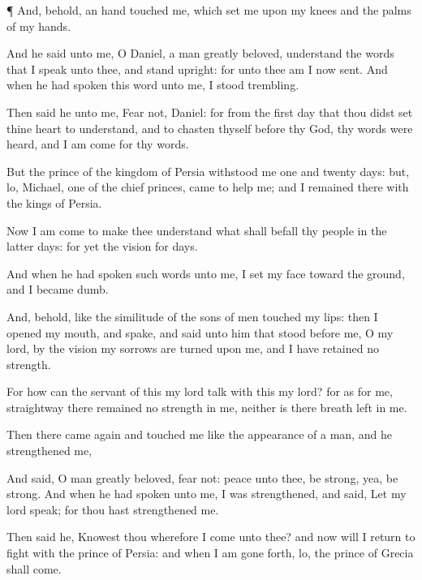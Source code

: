 {\par }{\PP {}¶ And, behold, an
hand
touched me, which
set me upon my
knees and
{} the
palms of my
hands.

And he
said unto me, O
Daniel, a
man greatly
beloved,
understand the
words that I
speak unto thee, and
stand
upright: for unto thee am I now
sent. And when he had
spoken this
word unto me, I
stood
trembling.

Then
said he unto me,
Fear not,
Daniel: for from the
first
day that thou didst
set thine
heart to
understand, and to
chasten thyself
before thy
God, thy
words were
heard, and I am
come for thy
words.

But the
prince of the
kingdom of
Persia
withstood me
one and
twenty
days: but, lo,
Michael,
one of the
chief
princes,
came to
help me; and I
remained there
with the
kings of
Persia.

Now I am
come to make thee
understand what shall
befall thy
people in the
latter
days: for yet the
vision
{} for
{}
days.

And when he had
spoken such
words unto me, I
set my
face toward the
ground, and I became
dumb.

And, behold,
{} like the
similitude of the
sons of
men
touched my
lips: then I
opened my
mouth, and
spake, and
said unto him that
stood before me, O my
lord, by the
vision my
sorrows are
turned upon me, and I have
retained no
strength.

For
how
can the
servant of this my
lord
talk with this my
lord? for as for me,
straightway there
remained no
strength in me, neither is there
breath
left in me.

Then there came
again and
touched me
{} like the
appearance of a
man, and he
strengthened me,

And
said, O
man greatly
beloved,
fear not:
peace
{} unto thee, be
strong, yea, be
strong. And when he had
spoken unto me, I was
strengthened, and
said, Let my
lord
speak; for thou hast
strengthened me.

Then
said he,
Knowest thou wherefore I
come unto thee? and now will I
return to
fight with the
prince of
Persia: and when I am gone
forth, lo, the
prince of
Grecia shall
come.

}
